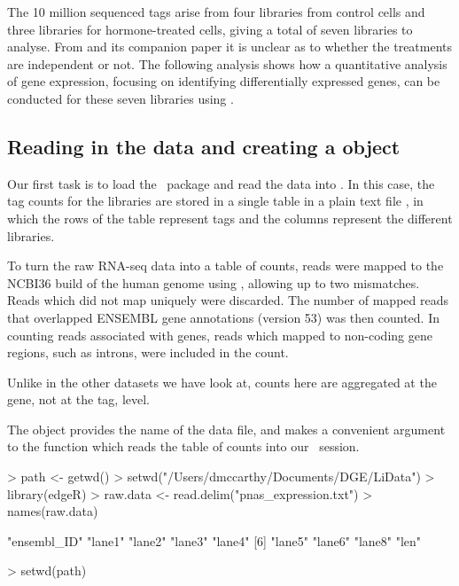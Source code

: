 The 10 million sequenced tags arise from four libraries from control
cells and three libraries for hormone-treated cells, giving a total of
seven libraries to analyse. From \citet{Li08} and its companion paper
\citep{Li:2006p382} it is unclear as to whether the treatments are
independent or not. The following analysis shows how a quantitative
analysis of gene expression, focusing on identifying differentially
expressed genes, can be conducted for these seven libraries using
\edgeR.

\subsection{Reading in the data and creating a  object}
Our first task is to load the \edgeR~package and read the data into
\R. In this case, the tag counts for the libraries are stored in a
single table in a plain text file , in
which the rows of the table represent tags and the columns represent
the different libraries.

To turn the raw RNA-seq data into a table of counts, reads were mapped
to the NCBI36 build of the human genome using , allowing
up to two mismatches. Reads which did not map uniquely were
discarded. The number of mapped reads that overlapped ENSEMBL gene
annotations (version 53) was then counted. In counting reads
associated with genes, reads which mapped to non-coding gene regions,
such as introns, were included in the count.

Unlike in the other datasets we have look at, counts here are
aggregated at the gene, not at the tag, level.

The  object provides the name of the data file, and makes
a convenient argument to the function  which reads
the table of counts into our \R~session.

\begin{Schunk}
\begin{Sinput}
> path <- getwd()
> setwd("/Users/dmccarthy/Documents/DGE/LiData")
> library(edgeR)
> raw.data <- read.delim("pnas_expression.txt")
> names(raw.data)
\end{Sinput}
\begin{Soutput}
[1] "ensembl_ID" "lane1"      "lane2"      "lane3"      "lane4"     
[6] "lane5"      "lane6"      "lane8"      "len"       
\end{Soutput}
\begin{Sinput}
> setwd(path)
\end{Sinput}
\end{Schunk}

